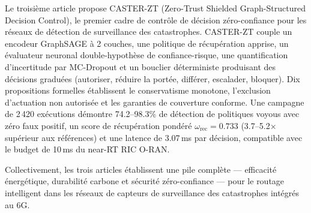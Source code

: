 Le troisième article propose CASTER-ZT (Zero-Trust Shielded Graph-Structured Decision Control), le premier cadre de contrôle de décision zéro-confiance pour les réseaux de détection de surveillance des catastrophes. CASTER-ZT couple un encodeur GraphSAGE à 2 couches, une politique de récupération apprise, un évaluateur neuronal double-hypothèse de confiance-risque, une quantification d'incertitude par MC-Dropout et un bouclier déterministe produisant des décisions graduées (autoriser, réduire la portée, différer, escalader, bloquer). Dix propositions formelles établissent le conservatisme monotone, l'exclusion d'actuation non autorisée et les garanties de couverture conforme. Une campagne de 2\,420 exécutions démontre 74.2--98.3\% de détection de politiques voyous avec zéro faux positif, un score de récupération pondéré $\omega_{\text{rec}} = 0.733$ (3.7--5.2$\times$ supérieur aux références) et une latence de 3.07\,ms par décision, compatible avec le budget de 10\,ms du near-RT RIC O-RAN.

Collectivement, les trois articles établissent une pile complète --- efficacité énergétique, durabilité carbone et sécurité zéro-confiance --- pour le routage intelligent dans les réseaux de capteurs de surveillance des catastrophes intégrés au 6G.

